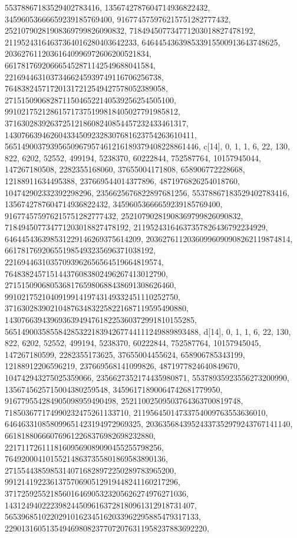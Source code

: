 {{{   55378867183529402783416, 1356742787604714936822432, 
   34596053666659239185769400, 916774575976215751282777432, 
   25210790281908369799826090832, 718494507734771203018827478192, 
   21195243164637364016280403642233, 646445436398533915500913643748625, 
   20362761120361640996972606200521834, 661781769206665452871142549688041584, 
   22169446310373466245939749116706256738, 
   764838245717201317212549427578052389058, 
   27151509068287115046522140539256254505100, 
   991021752128615717375199818405027791985812, 
   37163028392637251218608240854457232433461317, 
   1430766394626043345092328307681623754263610411, 
   56514900379395650967957461216189379408228861446}}, 
 {c[14], {0, 1, 1, 6, 22, 130, 822, 6202, 52552, 499194, 5238370, 60222844, 
   752587764, 10157945044, 147267180508, 2282355168060, 37655004171808, 
   658906772228668, 12188911634495388, 237669544014377896, 
   4871976826254018760, 104742902332392298296, 2356625676822897681256, 
   55378867183529402783416, 1356742787604714936822432, 
   34596053666659239185769400, 916774575976215751282777432, 
   25210790281908369799826090832, 718494507734771203018827478192, 
   21195243164637357826436792234929, 646445436398531229146269375614209, 
   20362761120360996090908262119874814, 661781769206551985493235696371038192, 
   22169446310357093962656564519664819574, 
   764838245715144376083802496267413012790, 
   27151509068053681765980688438691308626460, 
   991021752104091991419743149332451110252750, 
   37163028390210487634832258221687119595490880, 
   1430766394396936394947618225360372991810155285, 
   56514900358558428532218394267744111249889893488}}, 
 {d[14], {0, 1, 1, 6, 22, 130, 822, 6202, 52552, 499194, 5238370, 60222844, 
   752587764, 10157945045, 147267180599, 2282355173625, 37655004455624, 
   658906785343199, 12188912206596219, 237669568141099826, 
   4871977824640849670, 104742943275025359066, 2356627352174435980871, 
   55378935923556273200990, 1356745625715004380259548, 
   34596171890064742681779950, 916779554284905098959490498, 
   25211002509503764363700819748, 718503677174990232475261133710, 
   21195645014733754009763553636010, 646463310858099651423194972969325, 
   20363568439524337352979243767141140, 661818806660769612268376982698232880, 
   22171172611181609569089090455255798256, 
   764920004101552148637355801869583890136, 
   27155443859853140716828972250289783965200, 
   991214192236137570690512919448241160217296, 
   37172592552185601646905323205626274976271036, 
   1431249402223982445096163728180961312918731407, 
   56539685102202910162345162033962295885479317133, 
   2290131605135494698082377072076311958237883692220, 
}}}
